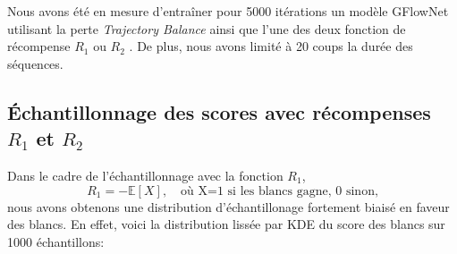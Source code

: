 \documentclass[11pt]{article}
\begin{document}
Nous avons été en mesure d'entraîner pour 5000 itérations un modèle
GFlowNet utilisant la perte \textit{Trajectory Balance} ainsi que
l'une des deux fonction de récompense $R_{1}$ ou $R_{2}$ . De plus,
nous avons limité à 20 coups la durée des séquences.
\subsection*{Échantillonnage des scores avec récompenses $R_{1}$ et $R_{2}$}
Dans le cadre de l'échantillonnage avec la fonction $R_{1}$,
\begin{equation*}
  R_{1} = - \mathbb{E}[X], \quad \text{où X=1 si les blancs gagne, 0
    sinon,}
\end{equation*}
nous avons obtenons une distribution d'échantillonage fortement biaisé
en faveur des blancs. En effet, voici la distribution lissée par KDE
du score des blancs sur 1000 échantillons:
\end{document}
